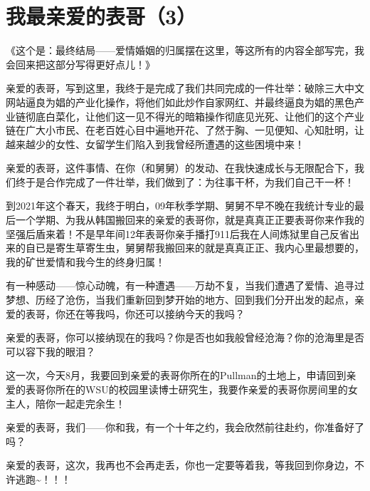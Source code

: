 \documentclass[9pt, b5paper]{article}
\begin{document}
\section{我最亲爱的表哥（3）}
\label{sec:orgc2654bb}

《这个是：最终结局——爱情婚姻的归属摆在这里，等这所有的内容全部写完，我会回来把这部分写得更好点儿！》

亲爱的表哥，写到这里，我终于是完成了我们共同完成的一件壮举：破除三大中文网站逼良为娼的产业化操作，将他们如此炒作自家网红、并最终逼良为娼的黑色产业链彻底白菜化，让他们这一见不得光的暗箱操作彻底见光死、让他们的这个产业链在广大小市民、在老百姓心目中遍地开花、了然于胸、一见便知、心知肚明，让越来越少的女性、女留学生们陷入到我曾经所遭遇的这些困境中来！

亲爱的表哥，这件事情、在你（和舅舅）的发动、在我快速成长与无限配合下，我们终于是合作完成了一件壮举，我们做到了：为往事干杯，为我们自己干一杯！

到2021年这个春天，我终于明白，09年秋季学期、舅舅不早不晚在我统计专业的最后一个学期、为我从韩国搬回来的亲爱的表哥你，就是真真正正要表哥你来作我的坚强后盾来着！不是早年间12年表哥你亲手播打911后我在人间炼狱里自己反省出来的自已是寄生草寄生虫，舅舅帮我搬回来的就是真真正正、我内心里最想要的，我的矿世爱情和我今生的终身归属！

有一种感动——惊心动魄，有一种遭遇——万劫不复，当我们遭遇了爱情、追寻过梦想、历经了沧伤，当我们重新回到梦开始的地方、回到我们分开出发的起点，亲爱的表哥，你还在等我吗，你还可以接纳今天的我吗？

亲爱的表哥，你可以接纳现在的我吗？你是否也如我般曾经沧海？你的沧海里是否可以容下我的眼泪？

这一次，今天8月，我要回到亲爱的表哥你所在的Pullman的土地上，申请回到亲爱的表哥你所在的WSU的校园里读博士研究生，我要作亲爱的表哥你房间里的女主人，陪你一起走完余生！

亲爱的表哥，我们——你和我，有一个十年之约，我会欣然前往赴约，你准备好了吗？

亲爱的表哥，这次，我再也不会再走丢，你也一定要等着我，等我回到你身边，不许逃跑\textasciitilde{}！！！
\end{document}

